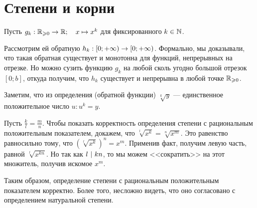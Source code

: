 \documentclass[a4paper]{report}
\begin{document}
    \section{Степени и корни}
    Пусть $g_k: \mathbb{R}_{\geqslant 0} \rightarrow \mathbb{R}; \quad x \mapsto x^k$ для фиксированного $k \in \mathbb{N}$.

    Рассмотрим ей обратную $h_k: [0; +\infty) \rightarrow [0; +\infty)$.
    Формально, мы доказывали, что такая обратная существует и монотонна для функций, непрерывных на отрезке.
    Но можно сузить функцию $g_k$ на любой сколь угодно большой отрезок $[0; b]$, откуда получим, что $h_k$ существует и непрерывна в любой точке $\mathbb{R}_{\geqslant 0}$.

    Заметим, что из определения (обратной функции) $\sqrt[k]{y}$ --- единственное положительное число $u: u^k = y$.

    Пусть $\frac{k}{l} = \frac{m}{n}$.
    Чтобы показать корректность определения степени с рациональным положительным показателем, докажем, что $\sqrt[l]{x^{k}} = \sqrt[n]{x^{m}}$.
    Это равенство равносильно тому, что $\left(\sqrt[l]{x^{k}}\right)^{n} = x^{m}$.
    Применив факт, получим левую часть, равной $\sqrt[l]{x^{k n}}$.
    Но так как $l ~|~ k n$, то мы можем <<сократить>> на этот множитель, получив искомое $x^{m}$.

    Таким образом, определение степени с рациональным положительным показателем корректно.
    Более того, несложно видеть, что оно согласовано с определением натуральной степени.
\end{document}
